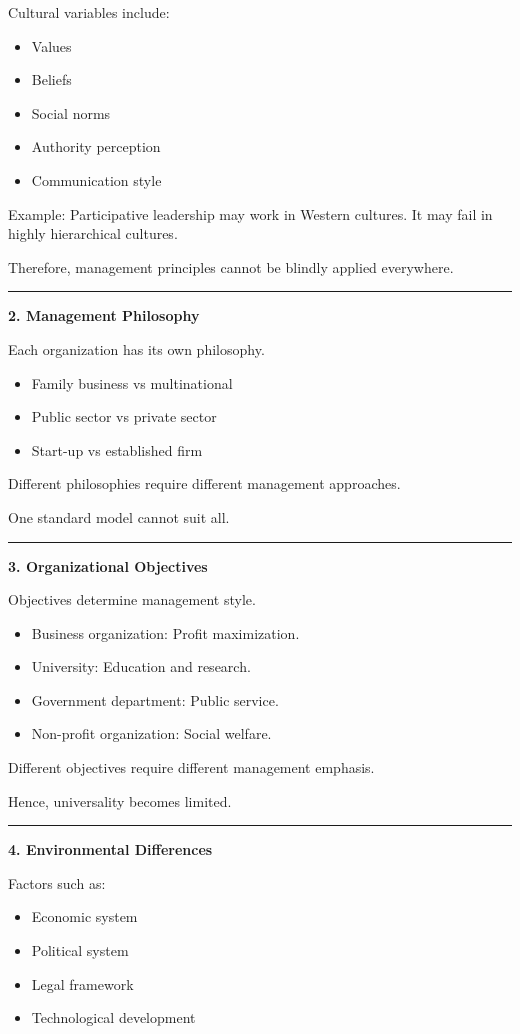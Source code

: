 \documentclass[10pt,a4paper]{article}
\newcommand{\separator}{\vspace{0.4em}\noindent\rule{\linewidth}{0.6pt}\vspace{0.4em}}
\begin{document}
Cultural variables include:
\begin{itemize}
  \item Values
  \item Beliefs
  \item Social norms
  \item Authority perception
  \item Communication style
\end{itemize}

Example: Participative leadership may work in Western cultures. It may fail in highly
hierarchical cultures.

Therefore, management principles cannot be blindly applied everywhere.

\separator

\textbf{2. Management Philosophy}

Each organization has its own philosophy.
\begin{itemize}
  \item Family business vs multinational
  \item Public sector vs private sector
  \item Start-up vs established firm
\end{itemize}

Different philosophies require different management approaches.

One standard model cannot suit all.

\separator

\textbf{3. Organizational Objectives}

Objectives determine management style.

\begin{itemize}
  \item Business organization: Profit maximization.
  \item University: Education and research.
  \item Government department: Public service.
  \item Non-profit organization: Social welfare.
\end{itemize}

Different objectives require different management emphasis.

Hence, universality becomes limited.

\separator

\textbf{4. Environmental Differences}

Factors such as:
\begin{itemize}
  \item Economic system
  \item Political system
  \item Legal framework
  \item Technological development
\end{itemize}
\end{document}
